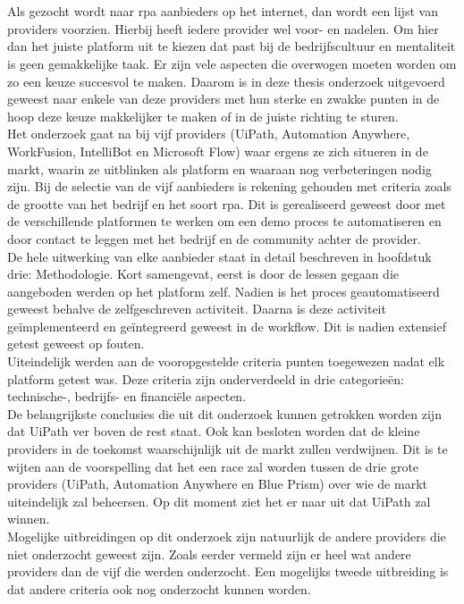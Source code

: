 \chapter*{}
Als gezocht wordt naar \acrshort{rpa} aanbieders op het internet, dan wordt een lijst van providers voorzien. Hierbij heeft iedere provider wel voor- en nadelen. Om hier dan het juiste platform uit te kiezen dat past bij de bedrijfscultuur en mentaliteit is geen gemakkelijke taak. Er zijn vele aspecten die overwogen moeten worden om zo een keuze succesvol te maken. Daarom is in deze thesis onderzoek uitgevoerd geweest naar enkele van deze providers met hun sterke en zwakke punten in de hoop deze keuze makkelijker te maken of in de juiste richting te sturen.\\
Het onderzoek gaat na bij vijf providers (UiPath, Automation Anywhere, WorkFusion, IntelliBot en Microsoft Flow) waar ergens ze zich situeren in de markt, waarin ze uitblinken als platform en waaraan nog verbeteringen nodig zijn. Bij de selectie van de vijf aanbieders is rekening gehouden met criteria zoals de grootte van het bedrijf en het soort \acrshort{rpa}. Dit is gerealiseerd geweest door met de verschillende platformen te werken om een demo proces te automatiseren en door contact te leggen met het bedrijf en de community achter de provider.\\
De hele uitwerking van elke aanbieder staat in detail beschreven in hoofdstuk drie: Methodologie. Kort samengevat, eerst is door de lessen gegaan die aangeboden werden op het platform zelf. Nadien is het proces geautomatiseerd geweest behalve de zelfgeschreven \gls{activiteit}. Daarna is deze \gls{activiteit} geïmplementeerd en geïntegreerd geweest in de \gls{workflow}. Dit is nadien extensief getest geweest op fouten.\\
Uiteindelijk werden aan de vooropgestelde criteria punten toegewezen nadat elk platform getest was. Deze criteria zijn onderverdeeld in drie categorieën: technische-, bedrijfs- en financiële aspecten.\\
De belangrijkste conclusies die uit dit onderzoek kunnen getrokken worden zijn dat UiPath ver boven de rest staat. Ook kan besloten worden dat de kleine providers in de toekomst waarschijnlijk uit de markt zullen verdwijnen. Dit is te wijten aan de voorspelling dat het een race zal worden tussen de drie grote providers (UiPath, Automation Anywhere en Blue Prism) over wie de markt uiteindelijk zal beheersen. Op dit moment ziet het er naar uit dat UiPath zal winnen.\\
Mogelijke uitbreidingen op dit onderzoek zijn natuurlijk de andere providers die niet onderzocht geweest zijn. Zoals eerder vermeld zijn er heel wat andere providers dan de vijf die werden onderzocht. Een mogelijks tweede uitbreiding is dat andere criteria ook nog onderzocht kunnen worden.